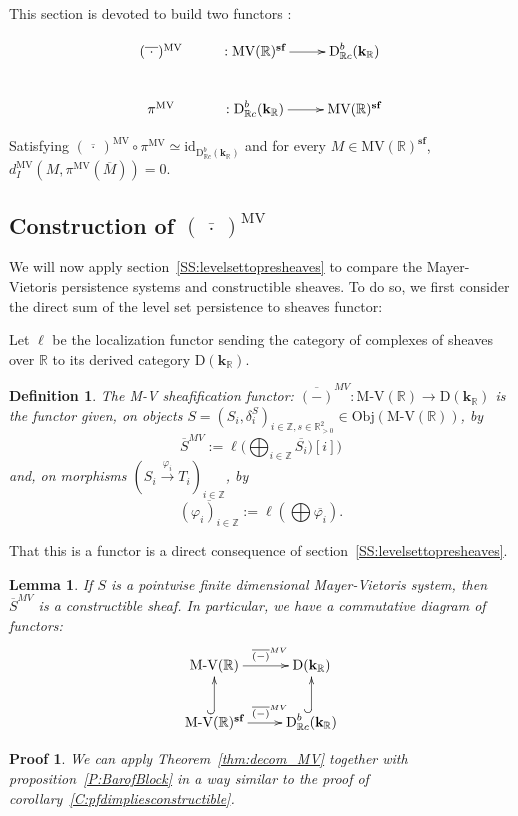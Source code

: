 \documentclass[a4paper, english, 11pt]{article}
\newcommand{\kk}[0]{\textbf{k}}
\newcommand{\0}{\vec{0}}
\newcommand{\R}[0]{\mathbb{R}}
\newcommand{\Z}[0]{\mathbb{Z}}
\newcommand{\D}[0]{\text{D}}
\newcommand{\Obj}[0]{\text{Obj}}
\newcommand{\MV}{\text{MV}}
\newcommand{\s}{\textbf{sf}}
\newtheorem*{pf}{Proof} }
\newtheorem{lem}[prop]{Lemma}
\newtheorem{defi}[prop]{Definition}
\begin{document}
This section is devoted to build two functors : 


$$\xymatrix{
(\overline{~\cdot~ })^{\text{MV}} & : \text{MV}(\R)^\s \ar[r] &\D^b_{\R c}(\kk_\R)  \\
\pi^{\text{MV}}  & : \D^b_{\R c}(\kk_\R) \ar[r] & \text{MV}(\R)^\s 
}$$

Satisfying $(\overline{~\cdot~ })^{\text{MV}} \circ \pi^{\text{MV}} \simeq \text{id}_{\D^b_{\R c}(\kk_\R)}$ and for every $M\in \text{MV}(\R)^\s$, $d_I^{\text{MV}}(M, \pi^\MV ( \overline{M})) = 0$.

\subsection{Construction of $(\overline{~\cdot~ })^{\text{MV}}$}
We will now apply section~\ref{SS:levelsettopresheaves} to compare the Mayer-Vietoris persistence systems and constructible sheaves. To do so, we first consider the direct sum of the level set persistence to sheaves functor: 

Let $\ell$ be the localization functor sending the category of complexes of sheaves over $\R$ to its derived category $\D(\kk_\R)$.
\begin{defi}\label{D:MVtoSheaves} The \emph{M-V sheafification functor}: $\overline{(-)}^{MV}: \text{M-V}(\R) \to  \D(\kk_\R)$ is the functor given, on
objects $S=(S_i, \delta_i^S)_{i\in \Z, s\in \R^2_{>0}}\in \Obj(\text{M-V}(\R))$, by 
$$ \overline{S}^{MV} := \ell\Big(\bigoplus_{i\in \Z} \overline{S_i})[i]\Big)$$ and, on morphisms $(S_i\stackrel{\varphi_i}\to T_i)_{i\in \Z}$, by 
$$\overline{(\varphi_i)_{i\in \Z}} := \ell(\bigoplus \overline{\varphi_i}). $$ 
\end{defi}
That this is a functor is a direct consequence of section~\ref{SS:levelsettopresheaves}.

\begin{lem}
 If $S$ is a pointwise finite dimensional Mayer-Vietoris system, then $\overline{S}^{MV}$ is a constructible sheaf. In particular, we have a commutative diagram of functors:
 $$\xymatrix{ \text{M-V}(\R) \ar[r]^{\quad\overline{(-)}^{MV}} & \D(\kk_\R) \\ 
 \text{M-V}(\R)^{\s} \ar@{^{(}->}[u]\ar[r]^{\quad\overline{(-)}^{MV}} & \D^b_{\R c}(\kk_\R) \ar@{^{(}->}[u].}  $$
\end{lem}
\begin{pf}
 We can apply Theorem~\ref{thm:decom_MV} together with proposition~\ref{P:BarofBlock} in a way similar to the proof of corollary~\ref{C:pfdimpliesconstructible}.
\end{pf}
\end{document}
